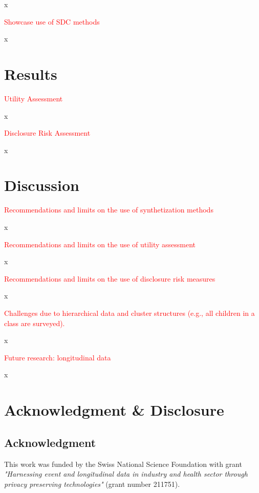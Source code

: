 \documentclass{article}
\begin{document}
x

\textcolor{red}{Showcase use of SDC methods}

x

\section{Results}

\textcolor{red}{Utility Assessment}

x

\textcolor{red}{Disclosure Risk Assessment}

x

\section{Discussion}

\textcolor{red}{Recommendations and limits on the use of synthetization methods}

x

\textcolor{red}{Recommendations and limits on the use of utility assessment}

x

\textcolor{red}{Recommendations and limits on the use of disclosure risk measures}

x

\textcolor{red}{Challenges due to hierarchical data and cluster structures (e.g., all children in a class are surveyed).}

x

\textcolor{red}{Future research: longitudinal data}

x

\section*{Acknowledgment \& Disclosure} 
\subsection*{Acknowledgment} 
This work was funded by the Swiss National Science Foundation with grant \textit{"Harnessing event and longitudinal data in industry and health sector through privacy preserving technologies"} (grant number 211751).
\end{document}
